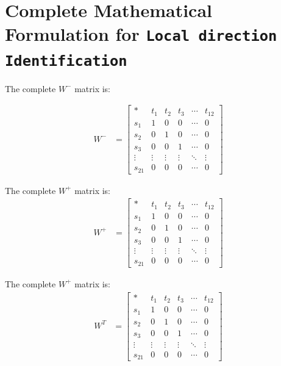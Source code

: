 \documentclass[12pt,a4paper]{article}
\begin{document}
\section{Complete Mathematical Formulation for \texttt{Local direction Identification}}
\label{app:direction}

The complete \(W^{-}\) matrix is:

\begin{align*}
W^{-} &= \begin{bmatrix}
                * & t_1 & t_2 & t_3 & \cdots & t_{12} \\
                s_1 & 1 & 0 & 0 & \cdots & 0 \\
                s_2 & 0 & 1 & 0 & \cdots & 0 \\
                s_3 & 0 & 0 & 1 & \cdots & 0 \\
                \vdots & \vdots & \vdots & \vdots & \ddots & \vdots \\
                s_{21} & 0 & 0 & 0 & \cdots & 0
             \end{bmatrix}
\end{align*}

The complete \(W^{+}\) matrix is:
\begin{align*}
    W^{+} &= \begin{bmatrix}
                * & t_1 & t_2 & t_3 & \cdots & t_{12} \\
                s_1 & 1 & 0 & 0 & \cdots & 0 \\
                s_2 & 0 & 1 & 0 & \cdots & 0 \\
                s_3 & 0 & 0 & 1 & \cdots & 0 \\
                \vdots & \vdots & \vdots & \vdots & \ddots & \vdots \\
                s_{21} & 0 & 0 & 0 & \cdots & 0
             \end{bmatrix}
\end{align*}

The complete \(W^{+}\) matrix is:
\begin{align*}
    W^{T} &= \begin{bmatrix}
                * & t_1 & t_2 & t_3 & \cdots & t_{12} \\
                s_1 & 1 & 0 & 0 & \cdots & 0 \\
                s_2 & 0 & 1 & 0 & \cdots & 0 \\
                s_3 & 0 & 0 & 1 & \cdots & 0 \\
                \vdots & \vdots & \vdots & \vdots & \ddots & \vdots \\
                s_{21} & 0 & 0 & 0 & \cdots & 0
             \end{bmatrix}
\end{align*}

\newpage


\end{document}
